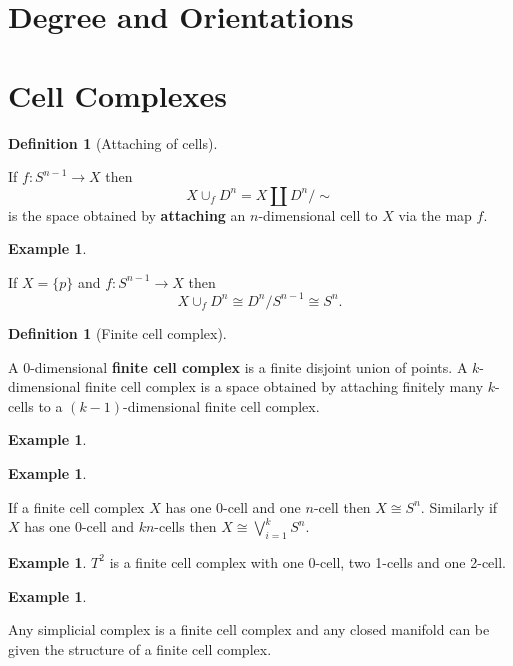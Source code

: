 \documentclass[10pt,]{book}
\newcommand{\terminology}[1]{\textbf{#1}}
\theoremstyle{plain}
\theoremstyle{definition}
\newtheorem{definition}[theorem]{Definition}
\newtheorem{example}[theorem]{Example}
\numberwithin{equation}{section}
\begin{document}
\section[Degree and Orientations]{Degree and Orientations}\label{section-6}
\typeout{************************************************}
\typeout{************************************************}
\section[Cell Complexes]{Cell Complexes}\label{section-7}
\begin{definition}[Attaching of cells]\label{definition-19}

            If \(f\colon S^{n-1} \to X\) then
            \[
              X\cup_f D^n = X\amalg D^n/\sim
            \]
            is the space obtained by \terminology{attaching} an \(n\)-dimensional cell to \(X\) via the map \(f\).
          \end{definition}
\begin{example}\label{example-16}

            If \(X = \{p\}\) and \(f\colon S^{n-1} \to X\) then
            \[
              X\cup_f D^n\cong D^n/S^{n-1} \cong S^n.
            \]\end{example}
\begin{definition}[Finite cell complex]\label{definition-20}

            A 0-dimensional \terminology{finite cell complex} is a finite disjoint union of points.
            \newline{}
            A \(k\)-dimensional finite cell complex is a space obtained by attaching finitely many \(k\)-cells to a \((k-1)\)-dimensional finite cell complex.
          \end{definition}
\begin{example}\label{example-17}
\end{example}
\begin{example}\label{example-18}

            If a finite cell complex \(X\) has one 0-cell and one \(n\)-cell then \(X \cong S^n\).
            Similarly if \(X\) has one 0-cell and \(k\)\(n\)-cells then \(X \cong \bigvee_{i=1}^{k}S^n\).
          \end{example}
\begin{example}\label{example-19}
\(T^2\) is a finite cell complex with one 0-cell, two 1-cells and one 2-cell.\end{example}
\begin{example}\label{example-20}

            Any simplicial complex is a finite cell complex and any closed manifold can be given the structure of a finite cell complex.
          \end{example}
\typeout{************************************************}
\typeout{************************************************}
\end{document}
